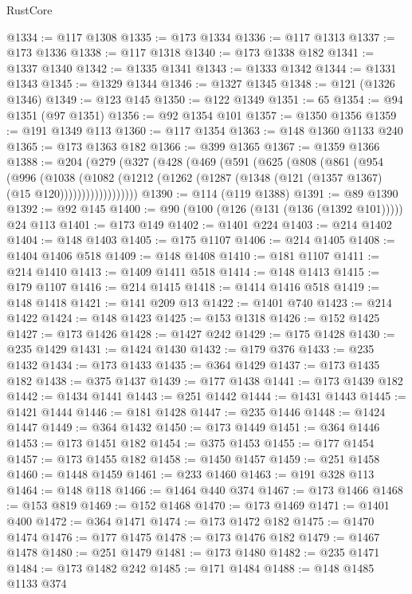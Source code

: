 \begin{lexlean}{RustCore}
\begin{coremodule}
@1334 := @117 @1308
@1335 := @173 @1334
@1336 := @117 @1313
@1337 := @173 @1336
@1338 := @117 @1318
@1340 := @173 @1338 @182
@1341 := @1337 @1340
@1342 := @1335 @1341
@1343 := @1333 @1342
@1344 := @1331 @1343
@1345 := @1329 @1344
@1346 := @1327 @1345
@1348 := @121 (@1326 @1346)
@1349 := @123 @145
@1350 := @122 @1349
@1351 := 65
@1354 := @94 @1351 (@97 @1351)
@1356 := @92 @1354 @101
@1357 := @1350 @1356
@1359 := @191 @1349 @113
@1360 := @117 @1354
@1363 := @148 @1360 @1133 @240
@1365 := @173 @1363 @182
@1366 := @399 @1365
@1367 := @1359 @1366
@1388 := @204
    (@279
      (@327
        (@428
          (@469
            (@591
              (@625
                (@808
                  (@861
                    (@954
                      (@996
                        (@1038
                          (@1082
                            (@1212
                              (@1262 (@1287 (@1348 (@121 (@1357 @1367) (@15 @120))))))))))))))))))
@1390 := @114 (@119 @1388)
@1391 := @89 @1390
@1392 := @92 @145
@1400 := @90 (@100 (@126 (@131 (@136 (@1392 @101))))) @24 @113
@1401 := @173 @149
@1402 := @1401 @224
@1403 := @214 @1402
@1404 := @148 @1403
@1405 := @175 @1107
@1406 := @214 @1405
@1408 := @1404 @1406 @518
@1409 := @148 @1408
@1410 := @181 @1107
@1411 := @214 @1410
@1413 := @1409 @1411 @518
@1414 := @148 @1413
@1415 := @179 @1107
@1416 := @214 @1415
@1418 := @1414 @1416 @518
@1419 := @148 @1418
@1421 := @141 @209 @13
@1422 := @1401 @740
@1423 := @214 @1422
@1424 := @148 @1423
@1425 := @153 @1318
@1426 := @152 @1425
@1427 := @173 @1426
@1428 := @1427 @242
@1429 := @175 @1428
@1430 := @235 @1429
@1431 := @1424 @1430
@1432 := @179 @376
@1433 := @235 @1432
@1434 := @173 @1433
@1435 := @364 @1429
@1437 := @173 @1435 @182
@1438 := @375 @1437
@1439 := @177 @1438
@1441 := @173 @1439 @182
@1442 := @1434 @1441
@1443 := @251 @1442
@1444 := @1431 @1443
@1445 := @1421 @1444
@1446 := @181 @1428
@1447 := @235 @1446
@1448 := @1424 @1447
@1449 := @364 @1432
@1450 := @173 @1449
@1451 := @364 @1446
@1453 := @173 @1451 @182
@1454 := @375 @1453
@1455 := @177 @1454
@1457 := @173 @1455 @182
@1458 := @1450 @1457
@1459 := @251 @1458
@1460 := @1448 @1459
@1461 := @233 @1460
@1463 := @191 @328 @113
@1464 := @148 @118
@1466 := @1464 @440 @374
@1467 := @173 @1466
@1468 := @153 @819
@1469 := @152 @1468
@1470 := @173 @1469
@1471 := @1401 @400
@1472 := @364 @1471
@1474 := @173 @1472 @182
@1475 := @1470 @1474
@1476 := @177 @1475
@1478 := @173 @1476 @182
@1479 := @1467 @1478
@1480 := @251 @1479
@1481 := @173 @1480
@1482 := @235 @1471
@1484 := @173 @1482 @242
@1485 := @171 @1484
@1488 := @148 @1485 @1133 @374

\end{coremodule}
\end{lexlean}
